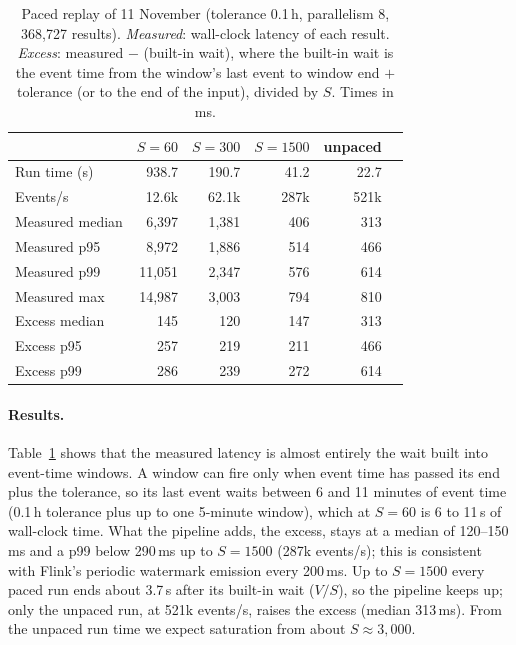 \begin{table}[t]
\caption{Paced replay of 11 November (tolerance 0.1\,h, parallelism 8,
368,727 results). \emph{Measured}: wall-clock latency of each result.
\emph{Excess}: measured $-$ (built-in wait), where the built-in wait is the
event time from the window's last event to window end $+$ tolerance (or to
the end of the input), divided by $S$. Times in ms.}\label{tab:paced}
\small
\begin{tabular}{lrrrrr}
\toprule
 & $S{=}60$ & $S{=}300$ & $S{=}1500$ & unpaced \\
\midrule
Run time (s)            & 938.7 & 190.7 & 41.2 & 22.7 \\
Events/s                & 12.6k & 62.1k & 287k & 521k \\
\midrule
Measured median         & 6,397 & 1,381 & 406 & 313 \\
Measured p95            & 8,972 & 1,886 & 514 & 466 \\
Measured p99            & 11,051 & 2,347 & 576 & 614 \\
Measured max            & 14,987 & 3,003 & 794 & 810 \\
\midrule
Excess median           & 145 & 120 & 147 & 313 \\
Excess p95              & 257 & 219 & 211 & 466 \\
Excess p99              & 286 & 239 & 272 & 614 \\
\bottomrule
\end{tabular}
\end{table}

\paragraph{Results.} Table~\ref{tab:paced} shows that the measured latency is
almost entirely the wait built into event-time windows. A window can fire only
when event time has passed its end plus the tolerance, so its last event waits
between 6 and 11 minutes of event time (0.1\,h tolerance plus up to one 5-minute
window), which at $S{=}60$ is 6 to 11\,s of wall-clock time. What the pipeline
adds, the excess, stays at a median of 120--150\,ms and a p99 below 290\,ms up
to $S{=}1500$ (287k events/s); this is consistent with Flink's periodic
watermark emission every 200\,ms. Up to $S{=}1500$ every paced run ends about
3.7\,s after its built-in wait ($V/S$), so the pipeline keeps up; only the
unpaced run, at 521k events/s, raises the excess (median 313\,ms). From the
unpaced run time we expect saturation from about $S \approx 3{,}000$.

